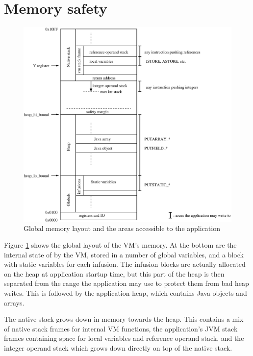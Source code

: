
\section{Memory safety}
\begin{figure}[]
  \includegraphics[width=\linewidth]{memlayout.eps}
  \caption{Global memory layout and the areas accessible to the application}
  \label{fig-memlayout}
\end{figure}

Figure \ref{fig-memlayout} shows the global layout of the VM's memory. At the bottom are the internal state of by the VM, stored in a number of global variables, and a block with static variables for each infusion. The infusion blocks are actually allocated on the heap at application startup time, but this part of the heap is then separated from the range the application may use to protect them from bad heap writes. This is followed by the application heap, which contains Java objects and arrays.

The native stack grows down in memory towards the heap. This contains a mix of native stack frames for internal VM functions, the application's JVM stack frames containing space for local variables and reference operand stack, and the integer operand stack which grows down directly on top of the native stack.

